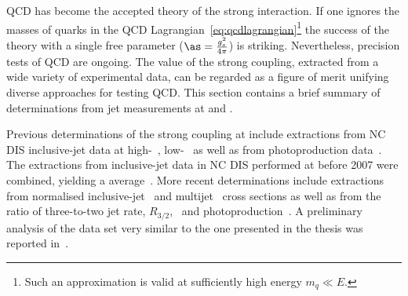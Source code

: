 QCD has become the accepted theory of the strong interaction. If one ignores the masses of quarks in the QCD Lagrangian~\eqref{eq:qcdlagrangian}\footnote{Such an approximation is valid at sufficiently high energy $m_q \ll E$.} the success of the theory with a single free parameter ($\as=\frac{g^2_s}{4\pi}$) is striking. Nevertheless, precision tests of QCD are ongoing. The value of the strong coupling, extracted from a wide variety of experimental data, can be regarded as a figure of merit unifying diverse approaches for testing QCD. This section contains a brief summary of \as determinations from jet measurements at \hera and \lhc.

Previous determinations of the strong coupling at \hera include extractions from NC DIS inclusive-jet data at high-\qsq~\cite{pl:b649:12,Aktas:2007aa}, low-\qsq~\cite{Aaron:2010ac} as well as from photoproduction data~\cite{pl:b560:7}. The extractions from inclusive-jet data in NC DIS performed at \hera before 2007 were combined, yielding a \hera average~\cite{upub:zp07125:hp07132}. More recent determinations include extractions from normalised inclusive-jet~\cite{epj:c65:363} and multijet~\cite{epj:c75:65} cross sections as well as from the ratio of three-to-two jet rate, $R_{3/2}$,~\cite{thesis:behr:2010} and photoproduction~\cite{np:b864:1}. A preliminary analysis of the data set very similar to the one presented in the thesis was reported in~\cite{upub:zp10002}.

